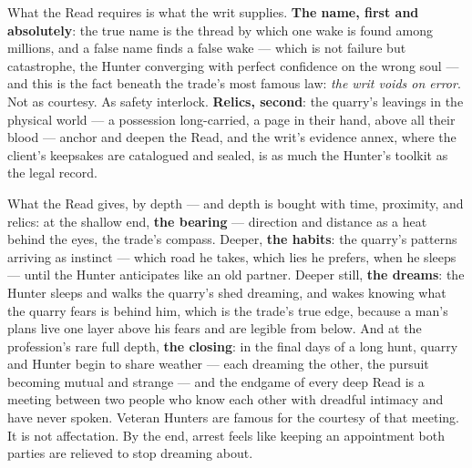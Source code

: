 What the Read requires is what the writ supplies. \textbf{The name, first and absolutely}: the true name is the thread by which one wake is found among millions, and a false name finds a false wake --- which is not failure but catastrophe, the Hunter converging with perfect confidence on the wrong soul --- and this is the fact beneath the trade's most famous law: \textit{the writ voids on error}. Not as courtesy. As safety interlock. \textbf{Relics, second}: the quarry's leavings in the physical world --- a possession long-carried, a page in their hand, above all their blood --- anchor and deepen the Read, and the writ's evidence annex, where the client's keepsakes are catalogued and sealed, is as much the Hunter's toolkit as the legal record.

What the Read gives, by depth --- and depth is bought with time, proximity, and relics: at the shallow end, \textbf{the bearing} --- direction and distance as a heat behind the eyes, the trade's compass. Deeper, \textbf{the habits}: the quarry's patterns arriving as instinct --- which road he takes, which lies he prefers, when he sleeps --- until the Hunter anticipates like an old partner. Deeper still, \textbf{the dreams}: the Hunter sleeps and walks the quarry's shed dreaming, and wakes knowing what the quarry fears is behind him, which is the trade's true edge, because a man's plans live one layer above his fears and are legible from below. And at the profession's rare full depth, \textbf{the closing}: in the final days of a long hunt, quarry and Hunter begin to share weather --- each dreaming the other, the pursuit becoming mutual and strange --- and the endgame of every deep Read is a meeting between two people who know each other with dreadful intimacy and have never spoken. Veteran Hunters are famous for the courtesy of that meeting. It is not affectation. By the end, arrest feels like keeping an appointment both parties are relieved to stop dreaming about.

